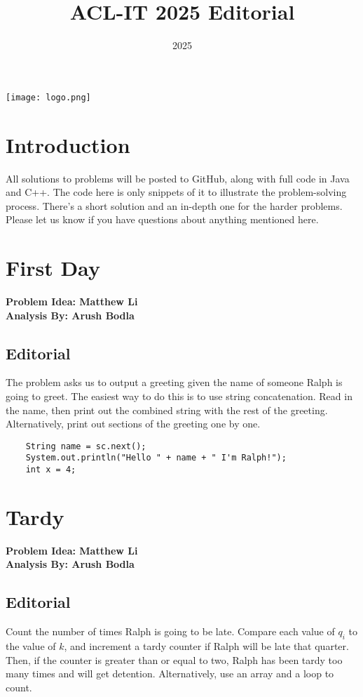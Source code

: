 \documentclass{article}
\title{ACL-IT 2025 Editorial}
\author{} %
\date{2025}
\begin{document}
\maketitle
\begin{center}
    \vfill
    \texttt{[image: logo.png]}
    \vfill
\end{center}

\newpage

\tableofcontents

\newpage

\section*{Introduction}
All solutions to problems will be posted to GitHub, along with full code in Java and C++. The code here is only snippets of it to illustrate the problem-solving process. There's a short solution and an in-depth one for the harder problems. Please let us know if you have questions about anything mentioned here.

\section{First Day}
\textbf{Problem Idea: Matthew Li\\ Analysis By: Arush Bodla}
\subsection{Editorial}
The problem asks us to output a greeting given the name of someone Ralph is going to greet. The easiest way to do this is to use string concatenation. Read in the name, then print out the combined string with the rest of the greeting. Alternatively, print out sections of the greeting one by one.

\begin{lstlisting}
    String name = sc.next();
    System.out.println("Hello " + name + " I'm Ralph!");
    int x = 4;
\end{lstlisting}


\section{Tardy}
\textbf{Problem Idea: Matthew Li\\ Analysis By: Arush Bodla}
\subsection{Editorial}
Count the number of times Ralph is going to be late. Compare each value of $q_i$ to the value of $k$, and increment a tardy counter if Ralph will be late that quarter. Then, if the counter is greater than or equal to two, Ralph has been tardy too many times and will get detention. Alternatively, use an array and a loop to count.
\end{document}
